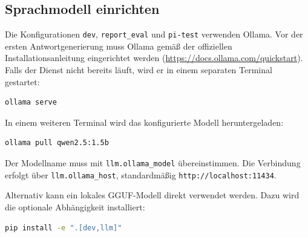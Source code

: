 \subsection{Sprachmodell einrichten}

Die Konfigurationen \texttt{dev}, \texttt{report\_eval} und
\texttt{pi-test} verwenden Ollama. Vor der ersten Antwortgenerierung muss
Ollama gemäß der offiziellen Installationsanleitung eingerichtet werden
(\url{https://docs.ollama.com/quickstart}). Falls der Dienst nicht bereits
läuft, wird er in einem separaten Terminal gestartet:

\par\nopagebreak[4]\smallskip
\noindent\begin{minipage}[t]{\linewidth}
\vspace{0pt}
\begin{lstlisting}[language=bash]
ollama serve
\end{lstlisting}
\end{minipage}\par\smallskip

In einem weiteren Terminal wird das konfigurierte Modell heruntergeladen:

\par\nopagebreak[4]\smallskip
\noindent\begin{minipage}[t]{\linewidth}
\vspace{0pt}
\begin{lstlisting}[language=bash]
ollama pull qwen2.5:1.5b
\end{lstlisting}
\end{minipage}\par\smallskip

Der Modellname muss mit \texttt{llm.ollama\_model} übereinstimmen.
Die Verbindung erfolgt über \texttt{llm.ollama\_host}, standardmäßig
\texttt{http:/\allowbreak{}/\allowbreak{}localhost:11434}.

Alternativ kann ein lokales GGUF-Modell direkt verwendet werden. Dazu wird
die optionale Abhängigkeit installiert:

\par\nopagebreak[4]\smallskip
\noindent\begin{minipage}[t]{\linewidth}
\vspace{0pt}
\begin{lstlisting}[language=bash]
pip install -e ".[dev,llm]"
\end{lstlisting}
\end{minipage}\par\smallskip

